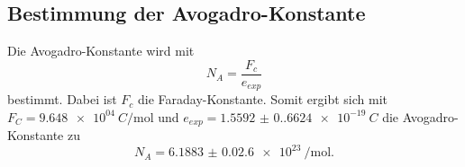 \subsection{Bestimmung der Avogadro-Konstante}
Die Avogadro-Konstante wird mit
\begin{equation*}
  N_A = \frac{F_c}{e_{exp}}
\end{equation*}
bestimmt. Dabei ist $F_c$ die Faraday-Konstante.
Somit ergibt sich mit $F_C = \SI{9.648e+04}{C\per\mol}$ \cite{faraday} und $e_{exp} = \SI{1.5592(0.6624)e-19}{C}$ die Avogadro-Konstante zu 
\begin{equation*}
  N_A = \SI{6.1883(2.6)e23}{\per\mol}.
\end{equation*}

\newpage